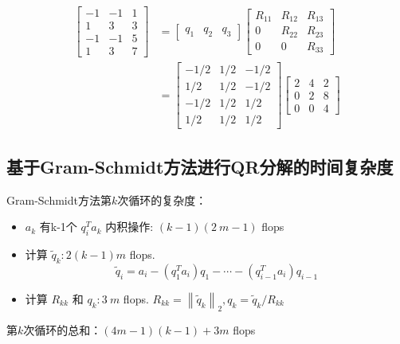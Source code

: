\begin{example}
$$
\begin{aligned}
\left[\begin{array}{rrr}
-1 & -1 & 1 \\
1 & 3 & 3 \\
-1 & -1 & 5 \\
1 & 3 & 7
\end{array}\right] &=\left[\begin{array}{lll}
q_{1} & q_{2} & q_{3}
\end{array}\right]\left[\begin{array}{ccc}
R_{11} & R_{12} & R_{13} \\
0 & R_{22} & R_{23} \\
0 & 0 & R_{33}
\end{array}\right] \\
&=\left[\begin{array}{rrr}
-1 / 2 & 1 / 2 & -1 / 2 \\
1 / 2 & 1 / 2 & -1 / 2 \\
-1 / 2 & 1 / 2 & 1 / 2 \\
1 / 2 & 1 / 2 & 1 / 2
\end{array}\right]\left[\begin{array}{rrr}
2 & 4 & 2 \\
0 & 2 & 8 \\
0 & 0 & 4
\end{array}\right]
\end{aligned}
$$
\end{example}

\subsection{基于Gram-Schmidt方法进行QR分解的时间复杂度}

Gram-Schmidt方法第$k$次循环的复杂度：

\begin{itemize}
    \item $ a_{k} $ 有k-1个 $ q_{i}^{T} a_{k} $ 内积操作: $ ( {k}-1)(2  {~m}-1) $ flops
    \item 计算 $ \tilde{q}_{k}: 2( {k}-1)  {m} $ flops. $$ \widetilde{q}_{i}=a_{i}-\left(q_{1}^{T} a_{i}\right) q_{1}-\cdots-\left(q_{i-1}^{T} a_{i}\right) q_{i-1} $$
    \item 计算 $ R_{k k} $ 和 $ q_{k}: 3  {~m} $ flops. $  R_{k k}=\left\|\tilde{q}_{k}\right\|_{2}, q_{k}=\tilde{q}_{k} / R_{k k} $
\end{itemize}

第$k$次循环的总和：$(4m-1)(k-1)+3m$ flops

